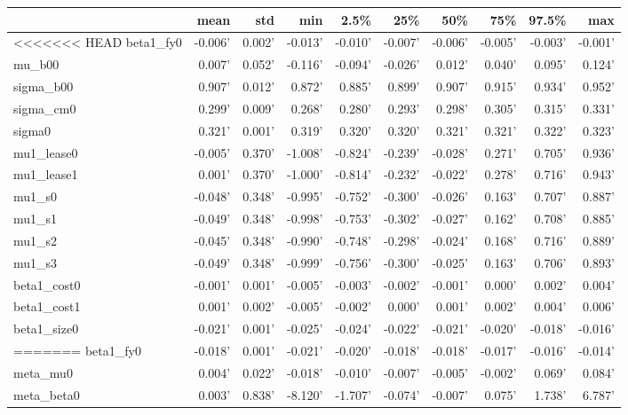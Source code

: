 \begin{tabular}{lrrrrrrrrr}
\toprule
{} &    mean &    std &     min &    2.5\% &     25\% &     50\% &     75\% &   97.5\% &     max \\
\midrule
<<<<<<< HEAD
beta1\_fy0   & -0.006' & 0.002' & -0.013' & -0.010' & -0.007' & -0.006' & -0.005' & -0.003' & -0.001' \\
mu\_b00      &  0.007' & 0.052' & -0.116' & -0.094' & -0.026' &  0.012' &  0.040' &  0.095' &  0.124' \\
sigma\_b00   &  0.907' & 0.012' &  0.872' &  0.885' &  0.899' &  0.907' &  0.915' &  0.934' &  0.952' \\
sigma\_cm0   &  0.299' & 0.009' &  0.268' &  0.280' &  0.293' &  0.298' &  0.305' &  0.315' &  0.331' \\
sigma0      &  0.321' & 0.001' &  0.319' &  0.320' &  0.320' &  0.321' &  0.321' &  0.322' &  0.323' \\
mu1\_lease0  & -0.005' & 0.370' & -1.008' & -0.824' & -0.239' & -0.028' &  0.271' &  0.705' &  0.936' \\
mu1\_lease1  &  0.001' & 0.370' & -1.000' & -0.814' & -0.232' & -0.022' &  0.278' &  0.716' &  0.943' \\
mu1\_s0      & -0.048' & 0.348' & -0.995' & -0.752' & -0.300' & -0.026' &  0.163' &  0.707' &  0.887' \\
mu1\_s1      & -0.049' & 0.348' & -0.998' & -0.753' & -0.302' & -0.027' &  0.162' &  0.708' &  0.885' \\
mu1\_s2      & -0.045' & 0.348' & -0.990' & -0.748' & -0.298' & -0.024' &  0.168' &  0.716' &  0.889' \\
mu1\_s3      & -0.049' & 0.348' & -0.999' & -0.756' & -0.300' & -0.025' &  0.163' &  0.706' &  0.893' \\
beta1\_cost0 & -0.001' & 0.001' & -0.005' & -0.003' & -0.002' & -0.001' &  0.000' &  0.002' &  0.004' \\
beta1\_cost1 &  0.001' & 0.002' & -0.005' & -0.002' &  0.000' &  0.001' &  0.002' &  0.004' &  0.006' \\
beta1\_size0 & -0.021' & 0.001' & -0.025' & -0.024' & -0.022' & -0.021' & -0.020' & -0.018' & -0.016' \\
=======
beta1\_fy0    & -0.018' & 0.001' & -0.021' & -0.020' & -0.018' & -0.018' & -0.017' & -0.016' & -0.014' \\
meta\_mu0     &  0.004' & 0.022' & -0.018' & -0.010' & -0.007' & -0.005' & -0.002' &  0.069' &  0.084' \\
meta\_beta0   &  0.003' & 0.838' & -8.120' & -1.707' & -0.074' & -0.007' &  0.075' &  1.738' &  6.787' \\

\end{tabular}
